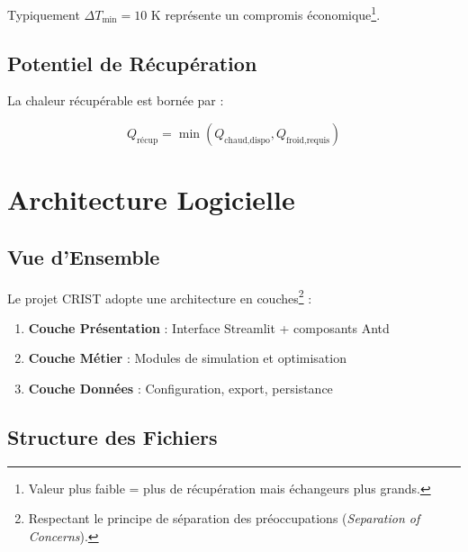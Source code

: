 \documentclass[12pt,a4paper,twoside]{article}
\begin{document}
Typiquement $\Delta T_{\min} = 10$ K représente un compromis économique\footnote{Valeur plus faible = plus de récupération mais échangeurs plus grands.}.

\subsection{Potentiel de Récupération}

La chaleur récupérable est bornée par :

\begin{equation}
\boxed{Q_{\text{récup}} = \min(Q_{\text{chaud,dispo}}, Q_{\text{froid,requis}})}
\end{equation}

\section{Architecture Logicielle}

\subsection{Vue d'Ensemble}

\lettrine[lines=2]{L}{}e projet CRIST adopte une architecture en couches\footnote{Respectant le principe de séparation des préoccupations (\textit{Separation of Concerns}).} :

\begin{enumerate}[noitemsep]
    \item \textbf{Couche Présentation} : Interface Streamlit + composants Antd
    \item \textbf{Couche Métier} : Modules de simulation et optimisation
    \item \textbf{Couche Données} : Configuration, export, persistance
\end{enumerate}

\subsection{Structure des Fichiers}
\end{document}
